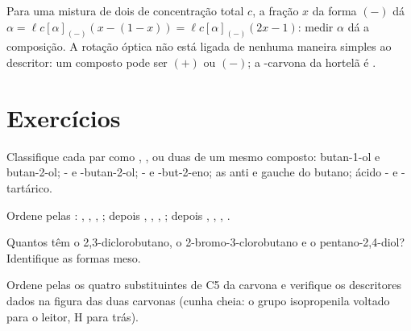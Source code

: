 Para uma mistura de dois  de concentração total $c$, a
fração $x$ da forma $(-)$ dá $\alpha = \ell c[\alpha]_{(-)}(x - (1 - x)) =
\ell c[\alpha]_{(-)}(2x - 1)$: medir $\alpha$ dá a composição. A rotação
óptica não está ligada de nenhuma maneira simples ao descritor: um
composto  pode ser $(+)$ ou $(-)$; a -carvona da hortelã é
.

\section{Exercícios}

\begin{exercise}[$\star$]\label{exo:b1:stereochemistry-in-depth:1}
Classifique cada par como , ,
 ou duas  de um mesmo composto: butan-1-ol
e butan-2-ol; - e -butan-2-ol; - e
-but-2-eno; as  anti e gauche do butano; ácido
- e -tartárico.
\end{exercise}

\begin{exercise}[$\star$]\label{exo:b1:stereochemistry-in-depth:2}
Ordene pelas : , , , ; depois
, , , ; depois ,
, , .
\end{exercise}

\begin{exercise}[$\star$]\label{exo:b1:stereochemistry-in-depth:3}
Quantos  têm o 2,3-diclorobutano, o
2-bromo-3-clorobutano e o pentano-2,4-diol? Identifique as formas meso.
\end{exercise}

\begin{exercise}[$\star$]\label{exo:b1:stereochemistry-in-depth:4}
Ordene pelas  os quatro substituintes de C5 da carvona e
verifique os descritores dados na figura das duas carvonas (cunha cheia:
o grupo isopropenila voltado para o leitor, H para trás).
\end{exercise}

